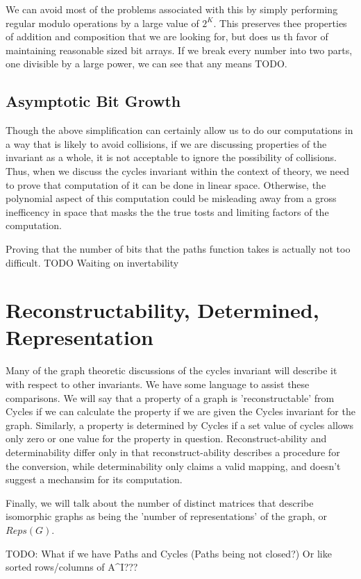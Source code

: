 \documentclass[11pt,a4paper]{report}
\begin{document}
We can avoid most of the problems associated with this by simply performing regular modulo operations by a large value of $2^K$.
This preserves thee properties of addition and composition that we are looking for, but does us th favor of maintaining reasonable sized bit arrays.
If we break every number into two parts, one divisible by a large power, we can see that any means TODO.

\subsection{Asymptotic Bit Growth}
Though the above simplification can certainly allow us to do our computations in a way that is likely to avoid collisions, if we are discussing properties of the invariant as a whole, it is not acceptable to ignore the possibility of collisions.
Thus, when we discuss the cycles invariant within the context of theory, we need to prove that computation of it can be done in linear space.
Otherwise, the polynomial aspect of this computation could be misleading away from a gross inefficency in space that masks the the true tosts and limiting factors of the computation.

Proving that the number of bits that the paths function takes is actually not too difficult.
TODO Waiting on invertability

\section{Reconstructability, Determined, Representation}
Many of the graph theoretic discussions of the cycles invariant will describe it with respect to other invariants. We have some language to assist these comparisons.
We will say that a property of a graph is 'reconstructable' from Cycles if we can calculate the property if we are given the Cycles invariant for the graph.
Similarly, a property is determined by Cycles if a set value of cycles allows only zero or one value for the property in question.
Reconstruct-ability and determinability differ only in that reconstruct-ability describes a procedure for the conversion, while determinability only claims a valid mapping, and doesn't suggest a mechansim for its computation.

Finally, we will talk about the number of distinct matrices that describe isomorphic graphs as being the 'number of representations' of the graph, or $Reps(G)$.

TODO: What if we have Paths and Cycles (Paths being not closed?) Or like sorted rows/columns of A^I???
\end{document}

